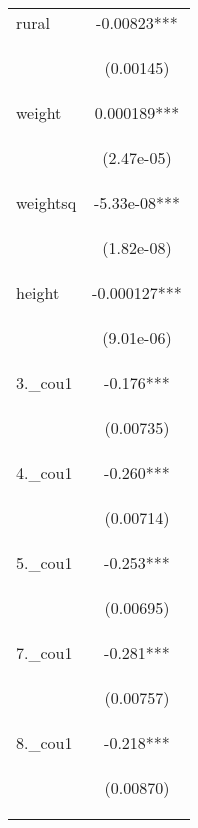\documentclass[]{article}
\begin{document}
\begin{center}
\begin{tabular}{lc}
rural & -0.00823*** \\
\vspace{4pt} & \begin{footnotesize}(0.00145)\end{footnotesize} \\
weight & 0.000189*** \\
\vspace{4pt} & \begin{footnotesize}(2.47e-05)\end{footnotesize} \\
weightsq & -5.33e-08*** \\
\vspace{4pt} & \begin{footnotesize}(1.82e-08)\end{footnotesize} \\
height & -0.000127*** \\
\vspace{4pt} & \begin{footnotesize}(9.01e-06)\end{footnotesize} \\
3.\_cou1 & -0.176*** \\
\vspace{4pt} & \begin{footnotesize}(0.00735)\end{footnotesize} \\
4.\_cou1 & -0.260*** \\
\vspace{4pt} & \begin{footnotesize}(0.00714)\end{footnotesize} \\
5.\_cou1 & -0.253*** \\
\vspace{4pt} & \begin{footnotesize}(0.00695)\end{footnotesize} \\
7.\_cou1 & -0.281*** \\
\vspace{4pt} & \begin{footnotesize}(0.00757)\end{footnotesize} \\
8.\_cou1 & -0.218*** \\
\vspace{4pt} & \begin{footnotesize}(0.00870)\end{footnotesize} \\

\end{tabular}
\end{center}
\end{document}
